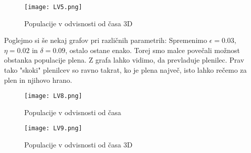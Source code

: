 \documentclass[11pt]{report}
\begin{document}
	\begin{figure}[!ht]
		\centering
		\hspace{-35mm}
		\vspace{8mm}
		\begin{minipage}{0.8\textwidth}
			\centering
			\vspace{-5mm}
			\texttt{[image: LV5.png]}
			\hspace{-20mm}
			\vspace{-5mm}
			\caption{Populacije v odvisnosti od časa 3D}
		\end{minipage}
	\end{figure}
	\newpage
	Poglejmo si še nekaj grafov pri različnih parametrih:
	Spremenimo $\epsilon= 0.03$, $\eta = 0.02$ in $\delta=0.09$, ostalo ostane enako. Torej smo malce povečali možnost obstanka populacije plena. Z grafa lahko vidimo, da prevladuje plenilec. Prav tako "skoki" plenilcev so ravno takrat, ko je plena največ, isto lahko rečemo za plen in njihovo hrano.
	\begin{figure}[!ht]
		\centering
		\hspace{-35mm}
		\vspace{8mm}
		\begin{minipage}{0.8\textwidth}
			\centering
			\vspace{-5mm}
			\texttt{[image: LV8.png]}
			\hspace{-20mm}
			\vspace{-5mm}
			\caption{Populacije v odvisnosti od časa}
		\end{minipage}
	\end{figure}
	\begin{figure}[!ht]
		\centering
		\hspace{-35mm}
		\vspace{8mm}
		\begin{minipage}{0.8\textwidth}
			\centering
			\vspace{-5mm}
			\texttt{[image: LV9.png]}
			\hspace{-20mm}
			\vspace{-5mm}
			\caption{Populacije v odvisnosti od časa 3D}
		\end{minipage}
	\end{figure}
	\newpage
\end{document}
